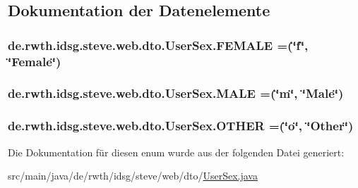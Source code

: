 \subsection{Dokumentation der Datenelemente}
\hypertarget{enumde_1_1rwth_1_1idsg_1_1steve_1_1web_1_1dto_1_1_user_sex_aa82cabc94ee438298f4bc78868ed628a}{
\subsubsection[{F\+E\+M\+A\+L\+E}]{\setlength{\rightskip}{0pt plus 5cm}de.\+rwth.\+idsg.\+steve.\+web.\+dto.\+User\+Sex.\+F\+E\+M\+A\+L\+E =(\char`\"{}f\char`\"{}, \char`\"{}Female\char`\"{})}}\label{enumde_1_1rwth_1_1idsg_1_1steve_1_1web_1_1dto_1_1_user_sex_aa82cabc94ee438298f4bc78868ed628a}
\hypertarget{enumde_1_1rwth_1_1idsg_1_1steve_1_1web_1_1dto_1_1_user_sex_a70e31e0ed5db4940c1060e714c168c3c}{
\subsubsection[{M\+A\+L\+E}]{\setlength{\rightskip}{0pt plus 5cm}de.\+rwth.\+idsg.\+steve.\+web.\+dto.\+User\+Sex.\+M\+A\+L\+E =(\char`\"{}m\char`\"{}, \char`\"{}Male\char`\"{})}}\label{enumde_1_1rwth_1_1idsg_1_1steve_1_1web_1_1dto_1_1_user_sex_a70e31e0ed5db4940c1060e714c168c3c}
\hypertarget{enumde_1_1rwth_1_1idsg_1_1steve_1_1web_1_1dto_1_1_user_sex_a0a5e04c68f2d3a46583ada44e1920da9}{
\subsubsection[{O\+T\+H\+E\+R}]{\setlength{\rightskip}{0pt plus 5cm}de.\+rwth.\+idsg.\+steve.\+web.\+dto.\+User\+Sex.\+O\+T\+H\+E\+R =(\char`\"{}o\char`\"{}, \char`\"{}Other\char`\"{})}}\label{enumde_1_1rwth_1_1idsg_1_1steve_1_1web_1_1dto_1_1_user_sex_a0a5e04c68f2d3a46583ada44e1920da9}


Die Dokumentation für diesen enum wurde aus der folgenden Datei generiert\+:\begin{DoxyCompactItemize}
\item 
src/main/java/de/rwth/idsg/steve/web/dto/\hyperlink{_user_sex_8java}{User\+Sex.\+java}\end{DoxyCompactItemize}
